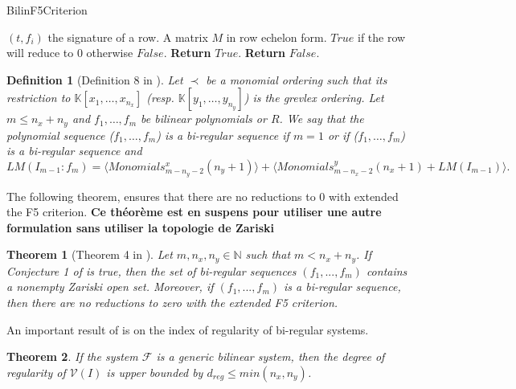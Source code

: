 \documentclass[english]{article}
\newtheorem{definition}{Definition}[section]
\newtheorem{theorem}{Theorem}[section]
\begin{document}
		\begin{algorithm}
			\caption{BilinF5Criterion}\label{algo:crit}
			\begin{algorithmic}[1]
				\Require $(t, f_i)$ the signature of a row. \newline A matrix $M$ in row echelon form.
				\Ensure $True$ if the row will reduce to 0 otherwise $False$.
				\State \textbf{Return} $True$.
				\Else \textbf{ Return} $False$.
				\EndIf
			\end{algorithmic}
		\end{algorithm}
		
		\begin{definition}[Definition 8 in \cite{FSS11}]
			Let $\prec$ be a monomial ordering such that its restriction to $\mathbb{K}[x_1,\dots,x_{n_x}]$ (resp. $\mathbb{K}[y_1,\dots,y_{n_y}]$) is the grevlex ordering. Let $m \leq n_x + n_y$ and $f_1,\dots,f_m$ be bilinear polynomials or $R$. We say that the polynomial sequence ($f_1,\dots,f_m$) is a \textit{bi-regular} sequence if $m = 1$ or if ($f_1,\dots,f_m$) is a \textit{bi-regular} sequence and
			$$
			LM(I_{m-1} : f_m) = \langle Monomials_{m - n_y - 2}^x(n_y + 1) \rangle + \langle Monomials_{m - n_x - 2}^y(n_x + 1) + LM(I_{m-1})\rangle.
			$$
		\end{definition}
		
		The following theorem, ensures that there are no reductions to 0 with extended the F5 criterion. \textbf{Ce théorème est en suspens pour utiliser une autre formulation sans utiliser la topologie de Zariski}
		
		\begin{theorem}[Theorem 4 in \cite{FSS11}]
			Let $m, n_x, n_y \in \mathbb{N}$ such that $m < n_x + n_y$. If Conjecture 1 of \cite{FSS11} is true, then the set of bi-regular sequences $(f_1,...,f_m)$ contains a nonempty Zariski open set. Moreover, if $(f_1,...,f_m)$ is a bi-regular sequence, then there are no reductions to zero with the extended F5 criterion.
		\end{theorem}
		
		An important result of \cite{FSS11} is on the index of regularity of bi-regular systems.
		
		\begin{theorem}\label{reg_bi}
			If the system $\mathcal{F}$ is a generic bilinear system, then the degree of regularity of $\mathcal{V}(I)$ is upper bounded by $d_{reg} \leq min(n_x, n_y)$.
		\end{theorem}
		
\end{document}
